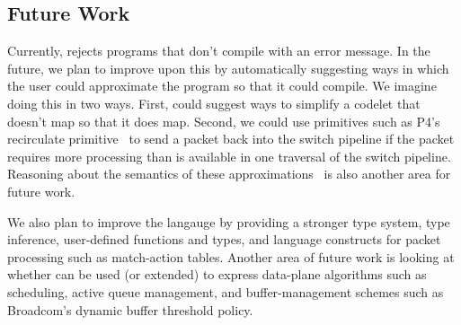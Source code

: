 \subsection{Future Work}
Currently, \pktlanguage rejects programs that don't compile with an error
message.  In the future, we plan to improve upon this by automatically
suggesting ways in which the user could approximate the program so that it
could compile. We imagine doing this in two ways. First, \pktlanguage could
suggest ways to simplify a codelet that doesn't map so that it does map.
Second, we could use primitives such as P4's recirculate primitive~\cite{p4spec}
to send a packet back into the switch pipeline if the packet
requires more processing than is available in one traversal of the switch
pipeline. Reasoning about the semantics of these
approximations~\cite{sampsonApprox, chisel} is also another area for future
work.

We also plan to improve the \pktlanguage langauge by providing a stronger type
system, type inference, user-defined functions and types, and language
constructs for packet processing such as match-action tables. Another area of
future work is looking at whether \pktlanguage can be used (or extended) to
express data-plane algorithms such as scheduling, active queue management, and
buffer-management schemes such as Broadcom's dynamic buffer threshold policy.

